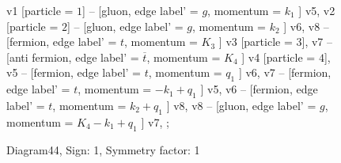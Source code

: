 \documentclass{revtex4}
\begin{document}
\begin{figure}[!htb]
\begin{center}
{    %
v1 [particle = \(1\)] -- [gluon, edge label' = \(g\), momentum = \(k_{1}\) ] v5, 
v2 [particle = \(2\)] -- [gluon, edge label' = \(g\), momentum = \(k_{2}\) ] v6, 
v8 -- [fermion, edge label' = \(t\), momentum = \(K_{3}\) ] v3 [particle = \(3\)], 
v7 -- [anti fermion, edge label' = \(\overline{t}\), momentum = \(K_{4}\) ] v4 [particle = \(4\)], 
v5 -- [fermion, edge label' = \(t\), momentum = \(q_{1}\) ] v6, 
v7 -- [fermion, edge label' = \(t\), momentum = \(-k_{1} + q_{1}\) ] v5, 
v6 -- [fermion, edge label' = \(t\), momentum = \(k_{2} + q_{1}\) ] v8, 
v8 -- [gluon, edge label' = \(g\), momentum = \(K_{4} - k_{1} + q_{1}\) ] v7, 
};
\end{center}
\caption{Diagram44, Sign: 1, Symmetry factor: 1}
\end{figure}
\newpage
\end{document}
